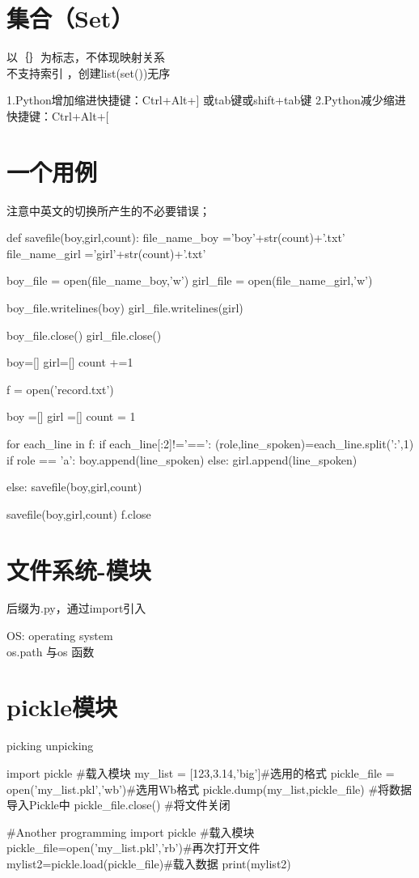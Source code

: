 \documentclass[a4paper,10pt]{ctexart}
\begin{document}
\section{集合（Set）}
以｛｝为标志，不体现映射关系\\
不支持索引 ，创建list(set())无序

1.Python增加缩进快捷键：Ctrl+Alt+] 或tab键或shift+tab键
2.Python减少缩进快捷键：Ctrl+Alt+[

\section{一个用例}
注意中英文的切换所产生的不必要错误；

\begin{python}
def savefile(boy,girl,count):
    file_name_boy ='boy'+str(count)+'.txt'
    file_name_girl ='girl'+str(count)+'.txt'


    boy_file = open(file_name_boy,'w')
    girl_file = open(file_name_girl,'w')


    boy_file.writelines(boy)
    girl_file.writelines(girl)


    boy_file.close()
    girl_file.close()

    boy=[]
    girl=[]
    count +=1

f = open('record.txt')

boy =[]
girl =[]
count = 1

for each_line in f:
    if each_line[:2]!='==':
        (role,line_spoken)=each_line.split(':',1)
        if role == 'a':
            boy.append(line_spoken)
        else:
            girl.append(line_spoken)

    else:
        savefile(boy,girl,count)

savefile(boy,girl,count)
f.close
\end{python}

\section{文件系统-模块}
后缀为.py，通过import引入

OS: operating system\\
os.path 与os 函数

\section{pickle模块}
picking
unpicking
\begin{python}
import pickle #载入模块
my_list = [123,3.14,'big']#选用的格式
pickle_file = open('my_list.pkl','wb')#选用Wb格式
pickle.dump(my_list,pickle_file) #将数据导入Pickle中
pickle_file.close()  #将文件关闭

#Another programming
import pickle #载入模块
pickle_file=open('my_list.pkl','rb')#再次打开文件
mylist2=pickle.load(pickle_file)#载入数据
print(mylist2)

\end{python}
\end{document}
